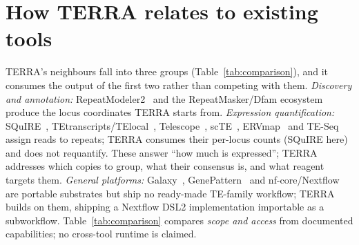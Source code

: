 \documentclass[11pt]{article}
\begin{document}
\section{How TERRA relates to existing tools}
\label{sec:comparison}

TERRA's neighbours fall into three groups (Table~\ref{tab:comparison}), and it consumes the
output of the first two rather than competing with them. \emph{Discovery and annotation:}
RepeatModeler2~\citep{flynn2020} and the RepeatMasker/Dfam ecosystem~\citep{hubley2016} produce
the locus coordinates TERRA starts from. \emph{Expression quantification:} SQuIRE~\citep{yang2019squire},
TEtranscripts/TElocal~\citep{jin2015tetranscripts}, Telescope~\citep{bendall2019telescope},
scTE~\citep{he2021scte}, ERVmap~\citep{tokuyama2018ervmap} and TE-Seq~\citep{kelsey2025teseq}
assign reads to repeats; TERRA consumes their per-locus counts (SQuIRE here) and does not
requantify. These answer ``how much is expressed''; TERRA addresses which copies to group,
what their consensus is, and what reagent targets them. \emph{General platforms:}
Galaxy~\citep{galaxy2022}, GenePattern~\citep{genepattern2006} and
nf-core/Nextflow~\citep{ewels2020,ditommaso2017} are portable substrates but ship no ready-made
TE-family workflow; TERRA builds on them, shipping a Nextflow DSL2 implementation importable as
a subworkflow. Table~\ref{tab:comparison} compares \emph{scope and access} from documented
capabilities; no cross-tool runtime is claimed.
\end{document}
